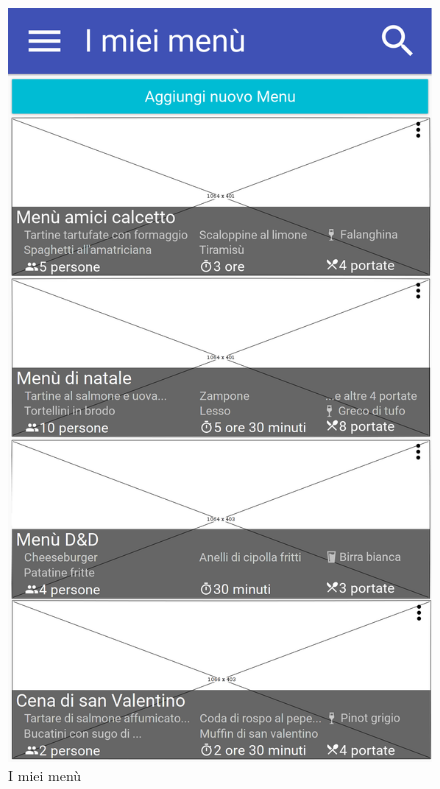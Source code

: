 \begin{figure}[H]
	\begin{minipage}{.49\textwidth}
		\includegraphics[width=\textwidth]{img/wireframe/i_miei_men.png}
		\caption{I miei menù}
	\end{minipage}
	\hfill
	\begin{minipage}{.49\textwidth}

\end{minipage}
\end{figure}
